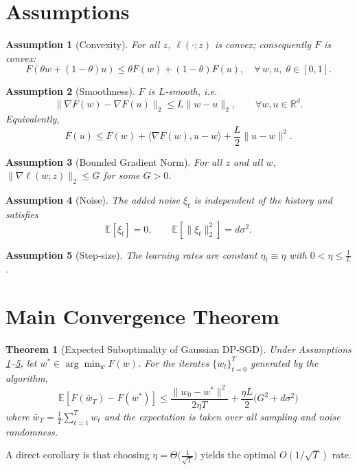 \documentclass{article}
\newtheorem{theorem}{Theorem}
\newtheorem{assumption}{Assumption}
\begin{document}
\newpage

\section*{Assumptions}
\begin{assumption}[Convexity]\label{ass:convex}
For all $z$, $\ell(\cdot;z)$ is convex; consequently $F$ is convex:
\[
F(\theta w+(1-\theta)u)\le \theta F(w)+(1-\theta)F(u),\quad\forall\,w,u,\;\theta\in[0,1].
\]
\end{assumption}
\begin{assumption}[Smoothness]\label{ass:smooth}
$F$ is $L$‑smooth, i.e.
\[
\|\nabla F(w)-\nabla F(u)\|_{2}\le L\|w-u\|_{2},\qquad\forall w,u\in\mathbb{R}^{d}.
\]
Equivalently,
\[
F(u)\le F(w)+\langle\nabla F(w),u-w\rangle+\frac{L}{2}\|u-w\|^{2}.
\tag{1}
\]
\end{assumption}
\begin{assumption}[Bounded Gradient Norm]\label{ass:bound}
For all $z$ and all $w$, $\|\nabla\ell(w;z)\|_{2}\le G$ for some $G>0$.
\end{assumption}
\begin{assumption}[Noise]\label{ass:noise}
The added noise $\xi_{t}$ is independent of the history and satisfies
\[
\mathbb{E}[\xi_{t}]=0,\qquad 
\mathbb{E}[\|\xi_{t}\|_{2}^{2}]=d\sigma^{2}.
\]
\end{assumption}
\begin{assumption}[Step‑size]\label{ass:stepsize}
The learning rates are constant $\eta_{t}\equiv\eta$ with $0<\eta\le\frac{1}{L}$.
\end{assumption}

\section*{Main Convergence Theorem}
\begin{theorem}[Expected Suboptimality of Gaussian DP‑SGD]\label{thm:main}
Under Assumptions \ref{ass:convex}–\ref{ass:stepsize}, let $w^{*}\in\arg\min_{w}F(w)$. For the iterates $\{w_{t}\}_{t=0}^{T}$ generated by the algorithm,
\[
\boxed{
\mathbb{E}\!\left[F(\bar w_{T})-F(w^{*})\right]\le
\frac{\|w_{0}-w^{*}\|^{2}}{2\eta T}
+\frac{\eta L}{2}\bigl(G^{2}+d\sigma^{2}\bigr)
}
\tag{2}
\]
where $\bar w_{T}= \frac{1}{T}\sum_{t=1}^{T}w_{t}$ and the expectation is taken over all sampling and noise randomness.
\end{theorem}
A direct corollary is that choosing $\eta=\Theta\!\bigl(\tfrac{1}{\sqrt{T}}\bigr)$ yields the optimal $O(1/\sqrt{T})$ rate.
\end{document}
